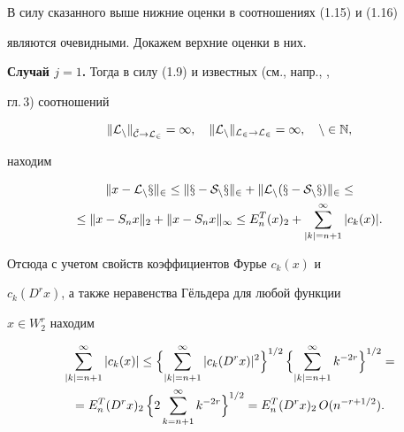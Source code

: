 \begin{pf} В силу сказанного выше нижние оценки в соотношениях (1.15) и (1.16)


являются очевидными. Докажем верхние оценки в них.





{\bf Случай $j=1$.} Тогда в силу (1.9) и известных (см., напр., \cite{Gab},


гл.\,3) соотношений


\begin{equation}


\|\cal {L}_n\|_{\Tilde{C}\to L_2}=1,\quad


\|\cal {L}_n\|_{L_2\to L_2}=\infty ,\quad n\in \Bbb{N},


\end{equation}


находим


\begin{gather}


\|x-\cal{L}_nx\|_2\le \|x-S_nx\|_2 +


\|\cal{L}_n(x-S_nx)\|_2 \le \notag\\


%


\le \|x-S_nx\|_2 +\|x-S_nx\|_\infty \le


E_n^T(x)_2 +\sum_{|k|=n+1}^\infty |c_k(x)|.


\end{gather}


Отсюда с учетом свойств коэффициентов Фурье $c_k(x)$ и


$c_k(D^rx)$, а также неравенства Г\"ельдера для любой функции


$x\in W_2^r$ находим


\begin{gather}


\sum_{|k|=n+1}^\infty |c_k(x)|\le \Bigl\{ \sum_{|k|=n+1}^\infty |c_k(D^rx)|^2


\Bigr\}^{1/2} \, \Bigl\{ \sum_{|k|=n+1}^\infty k^{-2r}\Bigr\}^{1/2}=


\notag\\


%


= E_n^T(D^rx)_2\,\Bigl\{ 2\sum_{k=n+1}^\infty k^{-2r}\Bigr\}^{1/2}=


E_n^T(D^rx)_2\, O(n^{-r+1/2}).


\end{gather}






\end{pf}
